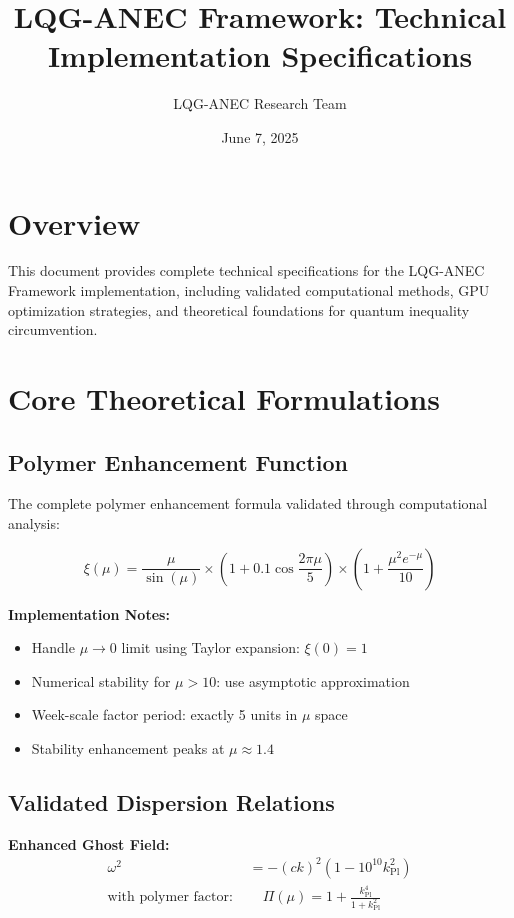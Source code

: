 \documentclass[11pt]{article}
\title{LQG-ANEC Framework: Technical Implementation Specifications}
\author{LQG-ANEC Research Team}
\date{June 7, 2025}
\begin{document}
\maketitle

\section{Overview}

This document provides complete technical specifications for the LQG-ANEC Framework implementation, including validated computational methods, GPU optimization strategies, and theoretical foundations for quantum inequality circumvention.

\section{Core Theoretical Formulations}

\subsection{Polymer Enhancement Function}

The complete polymer enhancement formula validated through computational analysis:

\begin{equation}
\xi(\mu) = \frac{\mu}{\sin(\mu)} \times \left(1 + 0.1\cos\frac{2\pi\mu}{5}\right) \times \left(1 + \frac{\mu^2 e^{-\mu}}{10}\right)
\end{equation}

\textbf{Implementation Notes:}
\begin{itemize}
    \item Handle $\mu \to 0$ limit using Taylor expansion: $\xi(0) = 1$
    \item Numerical stability for $\mu > 10$: use asymptotic approximation
    \item Week-scale factor period: exactly 5 units in $\mu$ space
    \item Stability enhancement peaks at $\mu \approx 1.4$
\end{itemize}

\subsection{Validated Dispersion Relations}

\textbf{Enhanced Ghost Field:}
\begin{align}
\omega^2 &= -(ck)^2\left(1 - 10^{10} k_{\text{Pl}}^2\right) \\
\text{with polymer factor: } &\quad \Pi(\mu) = 1 + \frac{k_{\text{Pl}}^4}{1 + k_{\text{Pl}}^2}
\end{align}
\end{document}

